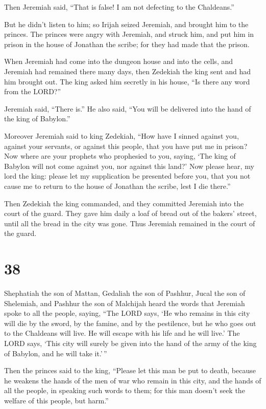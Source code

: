  Then Jeremiah said, ``That is false! I am not defecting to
the Chaldeans.''

But he didn't listen to him; so Irijah seized Jeremiah, and brought him
to the princes.  The princes were angry with Jeremiah, and
struck him, and put him in prison in the house of Jonathan the scribe;
for they had made that the prison.

 When Jeremiah had come into the dungeon house and into the
cells, and Jeremiah had remained there many days,  then
Zedekiah the king sent and had him brought out. The king asked him
secretly in his house, ``Is there any word from the LORD?''

Jeremiah said, ``There is.'' He also said, ``You will be delivered into
the hand of the king of Babylon.''

 Moreover Jeremiah said to king Zedekiah, ``How have I
sinned against you, against your servants, or against this people, that
you have put me in prison?  Now where are your prophets who
prophesied to you, saying, `The king of Babylon will not come against
you, nor against this land?'  Now please hear, my lord the
king: please let my supplication be presented before you, that you not
cause me to return to the house of Jonathan the scribe, lest I die
there.''

 Then Zedekiah the king commanded, and they committed
Jeremiah into the court of the guard. They gave him daily a loaf of
bread out of the bakers' street, until all the bread in the city was
gone. Thus Jeremiah remained in the court of the guard.

\hypertarget{section-37}{%
\section{38}\label{section-37}}

 Shephatiah the son of Mattan, Gedaliah the son of Pashhur,
Jucal the son of Shelemiah, and Pashhur the son of Malchijah heard the
words that Jeremiah spoke to all the people, saying,  ``The
LORD says, `He who remains in this city will die by the sword, by the
famine, and by the pestilence, but he who goes out to the Chaldeans will
live. He will escape with his life and he will live.'  The
LORD says, `This city will surely be given into the hand of the army of
the king of Babylon, and he will take it.'\,''

 Then the princes said to the king, ``Please let this man be
put to death, because he weakens the hands of the men of war who remain
in this city, and the hands of all the people, in speaking such words to
them; for this man doesn't seek the welfare of this people, but harm.''

